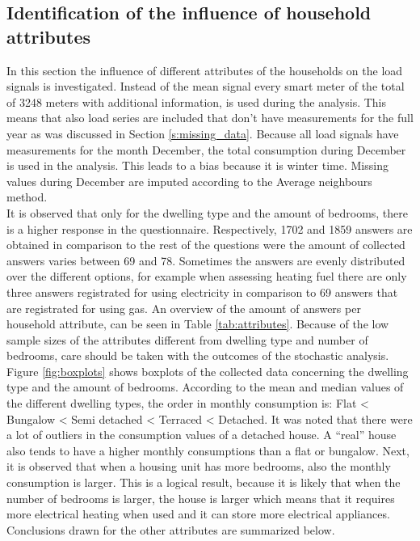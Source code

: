 \subsection{Identification of the influence of household attributes} \label{s:Identification of driving attributes}
In this section the influence of different attributes of the households on the load signals is investigated. Instead of the mean signal every smart meter of the total of 3248 meters with additional information, is used during the analysis. This means that also load series are included that don't have measurements for the full year as was discussed in Section \ref{s:missing_data}. Because all load signals have measurements for the month December, the total consumption during December is used in the analysis. This leads to a bias because it is winter time. Missing values during December are imputed according to the Average neighbours method.\\
It is observed that only for the dwelling type and the amount of bedrooms, there is a higher response in the questionnaire. Respectively, 1702 and 1859 answers are obtained in comparison to the rest of the questions were the amount of collected answers varies between 69 and 78. Sometimes the answers are evenly distributed over the different options, for example when assessing heating fuel there are only three answers registrated for using electricity in comparison to 69 answers that are registrated for using gas. An overview of the amount of answers per household attribute, can be seen in Table \ref{tab:attributes}. Because of the low sample sizes of the attributes different from dwelling type and number of bedrooms, care should be taken with the outcomes of the stochastic analysis.\\
Figure \ref{fig:boxplots} shows boxplots of the collected data concerning the dwelling type and the amount of bedrooms. According to the mean and median values of the different dwelling types, the order in monthly consumption is: Flat < Bungalow < Semi detached < Terraced < Detached. It was noted that there were a lot of outliers in the consumption values of a detached house. A ``real'' house also tends to have a higher monthly consumptions than a flat or bungalow. Next, it is observed that when a housing unit has more bedrooms, also the monthly consumption is larger. This is a logical result, because it is likely that when the number of bedrooms is larger, the house is larger which means that it requires more electrical heating when used and it can store more electrical appliances. Conclusions drawn for the other attributes are summarized below.

